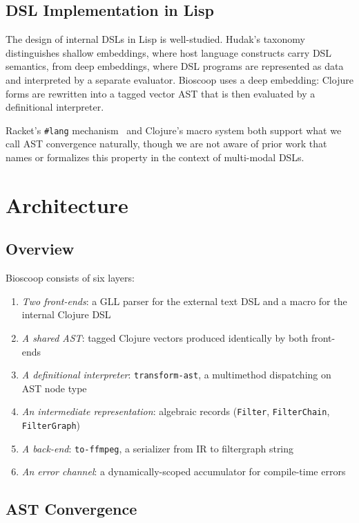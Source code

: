 \documentclass[conference]{IEEEtran}
\begin{document}
\subsection{DSL Implementation in Lisp}

The design of internal DSLs in Lisp is well-studied. Hudak's taxonomy~\cite{hudak} distinguishes shallow embeddings, where host language constructs carry DSL semantics, from deep embeddings, where DSL programs are represented as data and interpreted by a separate evaluator. Bioscoop uses a deep embedding: Clojure forms are rewritten into a tagged vector AST that is then evaluated by a definitional interpreter.

Racket's \texttt{\#lang} mechanism~\cite{racket} and Clojure's macro system both support what we call AST convergence naturally, though we are not aware of prior work that names or formalizes this property in the context of multi-modal DSLs.

\section{Architecture}

\subsection{Overview}

Bioscoop consists of six layers:

\begin{enumerate}
\item \emph{Two front-ends}: a GLL parser for the external text DSL and a macro for the internal Clojure DSL
\item \emph{A shared AST}: tagged Clojure vectors produced identically by both front-ends
\item \emph{A definitional interpreter}: \texttt{transform-ast}, a multimethod dispatching on AST node type
\item \emph{An intermediate representation}: algebraic records (\texttt{Filter}, \texttt{FilterChain}, \texttt{FilterGraph})
\item \emph{A back-end}: \texttt{to-ffmpeg}, a serializer from IR to filtergraph string
\item \emph{An error channel}: a dynamically-scoped accumulator for compile-time errors
\end{enumerate}

\subsection{AST Convergence}
\end{document}
